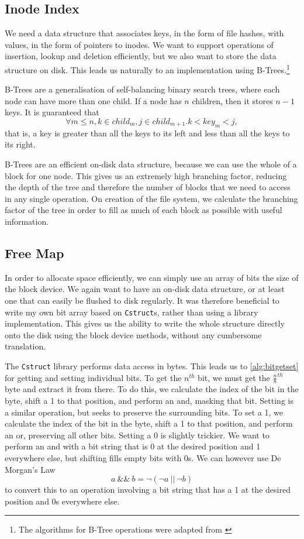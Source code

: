 \documentclass[12pt,a4paper,twoside,openright]{report}
\begin{document}
\subsection{Inode Index}
\label{subsec:inodeindex}

We need a data structure that associates keys, in the form of file hashes, with values, in the form of pointers to inodes. We want to support operations of insertion, lookup and deletion efficiently, but we also want to store the data structure on disk. This leads us naturally to an implementation using B-Trees.\footnote{The algorithms for B-Tree operations were adapted from \citet{CLRS09}}

B-Trees are a generalisation of self-balancing binary search trees, where each node can have more than one child. If a node has $n$ children, then it stores $n-1$ keys. It is guaranteed that $$ \forall m \leq n, k \in child_m, j \in child_{m+1} . k < key_m < j, $$ that is, a key is greater than all the keys to its left and less than all the keys to its right.

B-Trees are an efficient on-disk data structure, because we can use the whole of a block for one node. This gives us an extremely high branching factor, reducing the depth of the tree and therefore the number of blocks that we need to access in any single operation. On creation of the file system, we calculate the branching factor of the tree in order to fill as much of each block as possible with useful information.

\subsection{Free Map}
\label{subsec:freemap}

In order to allocate space efficiently, we can simply use an array of bits the size of the block device. We again want to have an on-disk data structure, or at least one that can easily be flushed to disk regularly. It was therefore beneficial to write my own bit array based on \texttt{Cstruct}s, rather than using a library implementation. This gives us the ability to write the whole structure directly onto the disk using the block device methods, without any cumbersome translation.

The \texttt{Cstruct} library performs data access in bytes. This leads us to \cref{alg:bitgetset} for getting and setting individual bits. To get the $n^{th}$ bit, we must get the $\frac{n}{8}^{th}$ byte and extract it from there. To do this, we calculate the index of the bit in the byte, shift a 1 to that position, and perform an and, masking that bit. Setting is a similar operation, but seeks to preserve the surrounding bits. To set a 1, we calculate the index of the bit in the byte, shift a 1 to that position, and perform an or, preserving all other bits. Setting a 0 is slightly trickier. We want to perform an and with a bit string that is 0 at the desired position and 1 everywhere else, but shifting fills empty bits with 0s. We can however use De Morgan's Law $$ a~\&\&~b = \neg (\neg a~||~\neg b) $$ to convert this to an operation involving a bit string that has a 1 at the desired position and 0s everywhere else.
\end{document}
